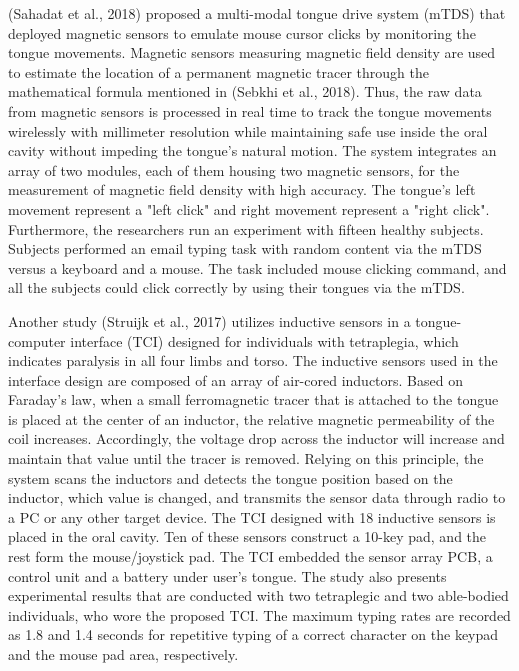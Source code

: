(Sahadat et al., 2018) proposed a multi-modal tongue drive system (mTDS) that deployed magnetic sensors to emulate mouse cursor clicks  by monitoring the tongue movements. Magnetic sensors measuring magnetic field density are used to estimate the location of a permanent magnetic tracer through the mathematical formula mentioned in (Sebkhi et al., 2018). Thus, the raw data from magnetic sensors is processed in real time to track the tongue movements wirelessly with millimeter resolution while maintaining safe use inside the oral cavity without impeding the tongue's natural motion. The system integrates an array of two modules, each of them housing two magnetic sensors, for the measurement of magnetic field density with high accuracy. The tongue's left movement represent a "left click" and right movement represent a "right click". Furthermore, the researchers run an experiment with fifteen healthy subjects. Subjects performed an email typing task with random content via the mTDS versus a keyboard and a mouse. The task included mouse clicking command, and all the subjects could click correctly by using their tongues via the mTDS.



Another study (Struijk et al., 2017) utilizes inductive sensors in a tongue-computer interface (TCI) designed for individuals with tetraplegia, which indicates paralysis in all four limbs and torso. The inductive sensors used in the interface design are composed of an array of air-cored inductors. Based on Faraday's law, when a small ferromagnetic tracer that is attached to the tongue is placed at the center of an inductor, the  relative magnetic permeability of the coil increases. Accordingly, the voltage drop across the inductor will increase and maintain that value until the tracer is removed. Relying on this principle, the system scans the inductors and detects the tongue position based on the inductor, which value is changed, and transmits the sensor data through radio to a PC or any other target device. The TCI designed with 18 inductive sensors is placed in the oral cavity. Ten of these sensors construct a 10-key pad, and the rest form the mouse/joystick pad. The TCI embedded the sensor array PCB, a control unit and a battery under user's tongue. The study also presents experimental results that are conducted with two tetraplegic and two able-bodied individuals, who wore the proposed TCI. The maximum typing rates are recorded as 1.8 and 1.4 seconds for repetitive typing of a correct character on the keypad and the mouse pad area, respectively. 


